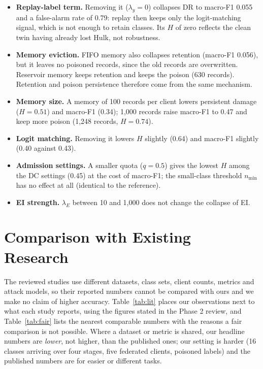 \documentclass[10pt,a4paper]{article}
\begin{document}
\begin{itemize}
\item \textbf{Replay-label term.} Removing it ($\lambda_y=0$) collapses DR to macro-F1 0.055 and a false-alarm rate of 0.79: replay then keeps only the logit-matching signal, which is not enough to retain classes. Its $H$ of zero reflects the clean twin having already lost Hulk, not robustness.
\item \textbf{Memory eviction.} FIFO memory also collapses retention (macro-F1 0.056), but it leaves no poisoned records, since the old records are overwritten. Reservoir memory keeps retention and keeps the poison (630 records). Retention and poison persistence therefore come from the same mechanism.
\item \textbf{Memory size.} A memory of 100 records per client lowers persistent damage ($H=0.51$) and macro-F1 (0.34); 1,000 records raise macro-F1 to 0.47 and keep more poison (1,248 records, $H=0.74$).
\item \textbf{Logit matching.} Removing it lowers $H$ slightly (0.64) and macro-F1 slightly (0.40 against 0.43).
\item \textbf{Admission settings.} A smaller quota ($q=0.5$) gives the lowest $H$ among the DC settings (0.45) at the cost of macro-F1; the small-class threshold $n_{\min}$ has no effect at all (identical to the reference).
\item \textbf{EI strength.} $\lambda_E$ between 10 and 1,000 does not change the collapse of EI.
\end{itemize}

\section{Comparison with Existing Research}\label{sec:lit}
The reviewed studies use different datasets, class sets, client counts, metrics and attack models, so their reported numbers cannot be compared with ours and we make no claim of higher accuracy. Table~\ref{tab:lit} places our observations next to what each study reports, using the figures stated in the Phase 2 review, and Table~\ref{tab:fair} lists the nearest comparable numbers with the reasons a fair comparison is not possible. Where a dataset or metric is shared, our headline numbers are \emph{lower}, not higher, than the published ones; our setting is harder (16 classes arriving over four stages, five federated clients, poisoned labels) and the published numbers are for easier or different tasks.
\end{document}
